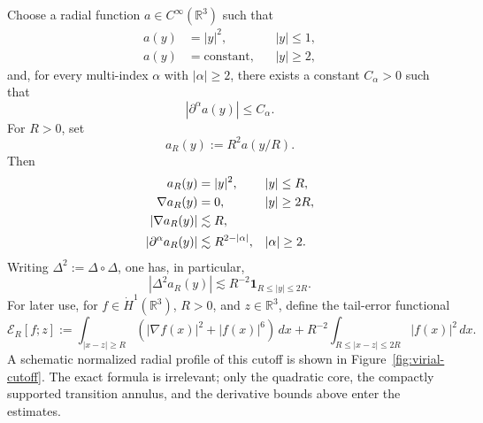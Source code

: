 \documentclass[smallextended,envcountsect,nospthms]{svjour3}
\numberwithin{equation}{section}
\theoremstyle{spbreak}
\theoremstyle{spdefbreak}
\theoremstyle{spdefbreak}
\newcommand{\R}{\mathbb R}
\begin{document}
Choose a radial function $a\in C^\infty(\R^3)$ such that
\begin{align*}
  a(y)&=|y|^2, && |y|\le1,\\
  a(y)&=\text{constant}, && |y|\ge2,
\end{align*}
and, for every multi-index $\alpha$ with $|\alpha|\ge2$, there exists a constant $C_\alpha>0$ such that
\begin{equation*}
  |\partial^\alpha a(y)|\le C_\alpha.
\end{equation*}
For $R>0$, set
\begin{equation*}
  a_R(y):=R^2a(y/R).
\end{equation*}
Then
\begin{align}
  a_R(y)&=|y|^2, && |y|\le R,\notag\\
  \nabla a_R(y)&=0, && |y|\ge2R,\notag\\
  |\nabla a_R(y)|&\lesssim R,\label{eq:aR-grad-bound}\\
  |\partial^\alpha a_R(y)|&\lesssim R^{2-|\alpha|}, && |\alpha|\ge2.\label{eq:aR-derivative-bound}
\end{align}
Writing $\Delta^2:=\Delta\circ\Delta$, one has, in particular,
\begin{equation}\label{eq:Delta2-aR-bound}
  |\Delta^2a_R(y)|\lesssim R^{-2}\mathbf 1_{R\le|y|\le2R}.
\end{equation}
For later use, for $f\in\dot H^1(\R^3)$, $R>0$, and $z\in\R^3$, define the tail-error functional
\begin{equation*}
  \mathcal E_R[f;z]
  :=\int_{|x-z|\ge R}(|\nabla f(x)|^2+|f(x)|^6)\,dx
  +R^{-2}\int_{R\le|x-z|\le2R}|f(x)|^2\,dx.
\end{equation*}
A schematic normalized radial profile of this cutoff is shown in Figure~\ref{fig:virial-cutoff}. The exact formula is irrelevant; only the quadratic core, the compactly supported transition annulus, and the derivative bounds above enter the estimates.
\end{document}
